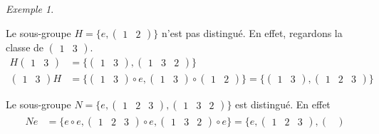 \documentclass{report}
\theoremstyle{definition}
\theoremstyle{remark}
\newtheorem*{exem}{Exemple}
\begin{document}
\begin{exem}
		\begin{ulist}
			\item Le sous-groupe $H=\{e, \begin{pmatrix}
				1&2
			\end{pmatrix}\}$ n'est pas distingu\'e. En effet, regardons la classe de $\begin{pmatrix}
				1&3
			\end{pmatrix}$.
			\begin{align*}
				H\begin{pmatrix}
					1&3
				\end{pmatrix}&= \{\begin{pmatrix}
					1&3
				\end{pmatrix}, \begin{pmatrix}
					1&3&2
				\end{pmatrix}\}\\
				\begin{pmatrix}
					1&3
				\end{pmatrix}H&= \{\begin{pmatrix}
					1&3
				\end{pmatrix} \circ e, \begin{pmatrix}
					1&3
				\end{pmatrix} \circ \begin{pmatrix}
					1&2
				\end{pmatrix}\} = \{\begin{pmatrix}
					1&3
				\end{pmatrix}, \begin{pmatrix}
					1&2&3
				\end{pmatrix}\}
			\end{align*}
			\item Le sous-groupe $N=\{e, \begin{pmatrix}
				1&2&3
			\end{pmatrix}, \begin{pmatrix}
				1&3&2
			\end{pmatrix}\}$ est distingu\'e. En effet
			\begin{align*}
				\begin{split}
					Ne&= \{e \circ e, \begin{pmatrix}
						1&2&3
					\end{pmatrix} \circ e, \begin{pmatrix}
						1&3&2
					\end{pmatrix} \circ e\} = \{e, \begin{pmatrix}
						1&2&3
					\end{pmatrix}, \begin{pmatrix}

\end{pmatrix}
\end{split}
\end{align*}
\end{ulist}
\end{exem}
\end{document}
